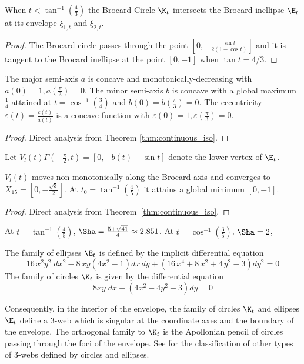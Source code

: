  \begin{proposition}
When $t<\tan^{-1}(\frac{4}{3})$  the Brocard Circle $\K_t$ intersects the Brocard inellipse $\E_t$ at its envelope $\xi_{1,t}$ and $\xi_{2,t}$.
 \end{proposition}
 \begin{proof}
  The Brocard circle passes through the point $[0,-\frac{\sin t}{2(1-\cos t)}  ]$ and it is tangent to the  Brocard inellipse at the point $[0,-1]$ when $\tan{t}=4/3$.
 \end{proof}
 

 
 \begin{proposition}
 The major semi-axis  $a$ is concave and monotonically-decreasing with $a(0)=1, a(\frac{\pi}{3})=0$. The minor semi-axis $b$ is concave with a global maximum $\frac{1}{4}$ attained at $t=\cos^{-1}(\frac{3}{4})$
 and $b(0)=b(\frac{\pi}{3})=0$.
 The eccentricity $\varepsilon(t)=\frac{c(t)}{a(t)} $ is a concave function with $\varepsilon(0)=1, \varepsilon(\frac{\pi}{3})=0$.
 \end{proposition}
 
\begin{proof}
Direct analysis from Theorem \ref{thm:continuous_iso}.
 \end{proof}

Let $V_l(t)\Gamma( -\frac{\pi}{2},t)=[0,-b(t)-\sin{t}]$ denote the lower vertex of $\E_t$.

\begin{corollary}
 $V_l(t)$ moves non-monotonically along the Brocard axis and converges to $X_{15}=[0,-\frac{\sqrt{3}}{2}]$. At $t_0=\tan^{-1}(\frac{4}{5})$ it attains a global minimum $[0,-1]$.
  \label{prop:vertices_ellipse_Et}
\end{corollary}

\begin{proof}  Direct analysis from Theorem~\ref{thm:continuous_iso}.
 \end{proof}

\begin{remark}
 At $t=\tan^{-1}(\frac{4}{5})$,  $\Sha=\frac{5+\sqrt{41}}{4}\approx 2.851$. At $t=\cos^{-1}(\frac{3}{5}) $, $\Sha=2$,
\end{remark}

\begin{remark}
 The family of ellipses $\E_t$ is defined by the implicit differential equation
 \[ 16\,{x}^{2}{y}^{2}\; dx^{2}-8\,xy \left( 4x^2-1 \right){ dx}\,{  dy}+ \left( 16\,{x}^{4}+8\,{x}^{2}+4\,{y}
^{2}-3 \right) dy^{2}=0
 \]
 The family of circles $\K_t$ is given by the differential equation
 \[ 8 x y\; dx-(4x^2-4y^2+3)dy=0\]
 
Consequently, in the interior of the envelope,
the family of circles $\K_t$ and ellipses $\E_t$ define a 3-web \cite{akopyan_2018} which is singular at the coordinate axes and the boundary of the envelope. The orthogonal family to $\K_t$ is the Apollonian
pencil of circles passing through the foci of the envelope. See \cite{akopyan_2018} for the classification of other types of 3-webs defined by circles and ellipses.
\end{remark}
 
